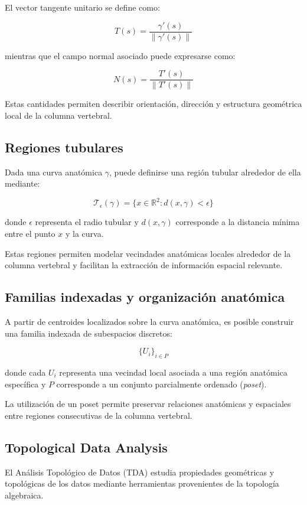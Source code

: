 \documentclass[conference]{IEEEtran}
\begin{document}
El vector tangente unitario se define como:

\[
T(s)=\frac{\gamma'(s)}{\|\gamma'(s)\|}
\]

mientras que el campo normal asociado puede expresarse como:

\[
N(s)=\frac{T'(s)}{\|T'(s)\|}
\]

Estas cantidades permiten describir orientación, dirección y estructura geométrica local de la columna vertebral.

\subsection{Regiones tubulares}

Dada una curva anatómica $\gamma$, puede definirse una región tubular alrededor de ella mediante:

\[
\mathcal{T}_{\epsilon}(\gamma)=
\{x\in\mathbb{R}^2 : d(x,\gamma)<\epsilon\}
\]

donde $\epsilon$ representa el radio tubular y $d(x,\gamma)$ corresponde a la distancia mínima entre el punto $x$ y la curva.

Estas regiones permiten modelar vecindades anatómicas locales alrededor de la columna vertebral y facilitan la extracción de información espacial relevante.

\subsection{Familias indexadas y organización anatómica}

A partir de centroides localizados sobre la curva anatómica, es posible construir una familia indexada de subespacios discretos:

\[
\{U_i\}_{i\in P}
\]

donde cada $U_i$ representa una vecindad local asociada a una región anatómica específica y $P$ corresponde a un conjunto parcialmente ordenado (\textit{poset}).

La utilización de un poset permite preservar relaciones anatómicas y espaciales entre regiones consecutivas de la columna vertebral.

\subsection{Topological Data Analysis}

El Análisis Topológico de Datos (TDA) estudia propiedades geométricas y topológicas de los datos mediante herramientas provenientes de la topología algebraica.
\end{document}
